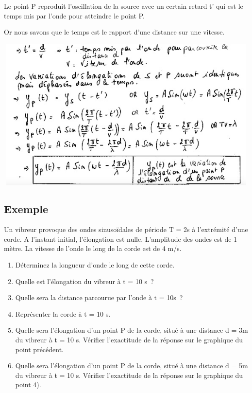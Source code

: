 \begin{multicols}{2}
Le point P reproduit l'oscillation de la source avec un certain retard
t' qui est le temps mis par l'onde pour atteindre le point P.

Or nous savons que le temps est le rapport d'une distance sur une
vitesse.

\includegraphics[width=14.152cm,height=7.717cm]{Pictures/100000010000039C0000022244D6A7EE40B9357C.png}

\subsection{Exemple}

Un vibreur provoque des ondes sinusoïdales de période T = 2s à
l'extrémité d'une corde. A l'instant initial, l'élongation est nulle.
L'amplitude des ondes est de 1 mètre. La vitesse de l'onde le long de la
corde est de 4 m/s.

\begin{enumerate}
\item  Déterminez la longueur d'onde le long de cette corde.
\item  Quelle est l'élongation du vibreur à t = 10 s~?
\item  Quelle sera la distance parcourue par l'onde à t = 10s~?
\item  Représenter la corde à t = 10 s.
\item  Quelle sera l'élongation d'un point P de la corde, situé à une
  distance d = 3m du vibreur à t = 10 s.
Vérifier l'exactitude de la réponse sur le graphique du point précédent.
\item  Quelle sera l'élongation d'un point P de la corde, situé à une
  distance d = 5m du vibreur à t = 10 s.
Vérifier l'exactitude de la réponse sur le graphique du point 4).
\end{enumerate}

\end{multicols}
